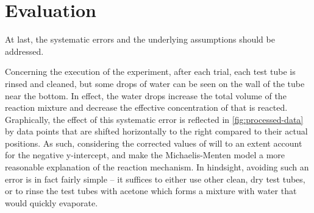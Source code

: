 \documentclass[a4paper, 12pt]{article}
\begin{document}
\section*{Evaluation}
At last, the systematic errors and the underlying assumptions should be addressed.

Concerning the execution of the experiment, after each trial, each test tube is rinsed and cleaned, but some drops of water can be seen on the wall of the tube near the bottom. In effect, the water drops increase the total volume of the reaction mixture and decrease the effective concentration of  that is reacted. Graphically, the effect of this systematic error is reflected in \cref{fig:processed-data} by data points that are shifted horizontally to the right compared to their actual positions. As such, considering the corrected values of \ce{[H2O2]} will to an extent account for the negative y-intercept, and make the Michaelis-Menten model a more reasonable explanation of the reaction mechanism. In hindsight, avoiding such an error is in fact fairly simple -- it suffices to either use other clean, dry test tubes, or to rinse the test tubes with acetone which forms a mixture with water that would quickly evaporate.
\end{document}
